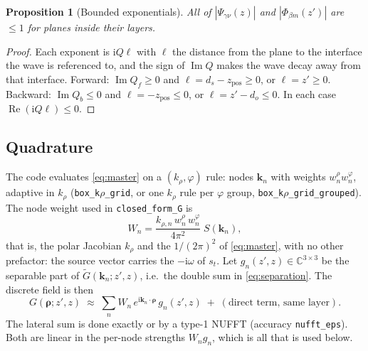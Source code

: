 \documentclass[11pt,a4paper]{article}
\newcommand{\code}[1]{\texttt{#1}}
\newcommand{\kn}{\mathbf{k}_n}
\newcommand{\bfrho}{\boldsymbol{\rho}}
\newcommand{\ii}{\mathrm{i}}
\newcommand{\abs}[1]{\left\lvert #1 \right\rvert}
\newtheorem{proposition}{Proposition}
\theoremstyle{remark}
\begin{document}
\begin{proposition}[Bounded exponentials]
\label{prop:bounded}
All of $\abs{\Psi_{\gamma\nu}(z)}$ and $\abs{\Phi_{\beta m}(z')}$ are $\le 1$ for planes inside their layers.
\end{proposition}
\begin{proof}
Each exponent is $\ii Q\ell$ with $\ell$ the distance from the plane to the interface
the wave is referenced to, and the sign of $\operatorname{Im} Q$ makes the wave decay
away from that interface. Forward: $\operatorname{Im} Q_f\ge0$ and $\ell=d_s-z_{\mathrm{pos}}\ge0$, or
$\ell=z'\ge0$. Backward: $\operatorname{Im} Q_b\le0$ and $\ell=-z_{\mathrm{pos}}\le0$, or
$\ell=z'-d_o\le 0$. In each case $\operatorname{Re}(\ii Q\ell)\le0$.
\end{proof}

\subsection{Quadrature}

The code evaluates \eqref{eq:master} on a $(k_\rho,\varphi)$ rule: nodes $\kn$ with weights
$w^\rho_n w^\varphi_n$, adaptive in $k_\rho$ (\code{box\_k$\rho$\_grid}, or one $k_\rho$ rule per
$\varphi$ group, \code{box\_k$\rho$\_grid\_grouped}). The node weight used in \code{closed\_form\_G} is
\begin{equation}
  W_n = \frac{k_{\rho,n}\, w^\rho_n\, w^\varphi_n}{4\pi^2}\; S(\kn),
  \label{eq:weights}
\end{equation}
that is, the polar Jacobian $k_\rho$ and the $1/(2\pi)^2$ of \eqref{eq:master}, with no other
prefactor: the source vector carries the $-\ii\omega$ of $s_t$. Let $g_n(z',z)\in\mathbb{C}^{3\times3}$ be the
separable part of $\widetilde G(\kn; z', z)$, i.e.\ the double sum in \eqref{eq:separation}.
The discrete field is then
\begin{equation}
  G(\bfrho; z', z) \;\approx\; \sum_n W_n\, e^{\ii\kn\cdot\bfrho}\, g_n(z', z)
  \;+\; (\text{direct term, same layer}).
  \label{eq:discrete}
\end{equation}
The lateral sum is done exactly or by a type-1 NUFFT (accuracy \code{nufft\_eps}).
Both are linear in the per-node strengths $W_n g_n$, which is all that is used below.
\end{document}
